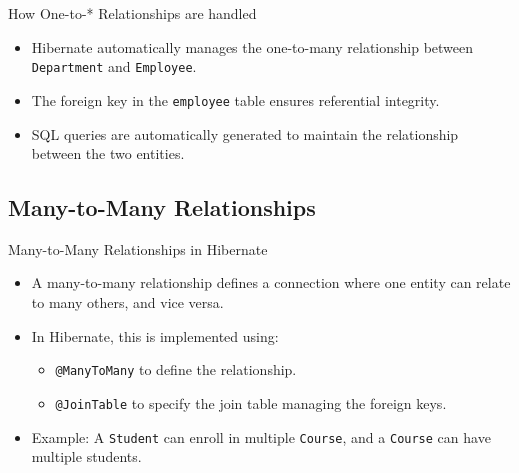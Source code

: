 \documentclass[aspectratio=169, table]{beamer}
\begin{document}
\begin{frame}{How One-to-* Relationships are handled}
	\vspace{20pt}
	\begin{itemize}
		\item Hibernate automatically manages the one-to-many relationship between \texttt{Department} and \texttt{Employee}.
		\item The foreign key in the \texttt{employee} table ensures referential integrity.
		\item SQL queries are automatically generated to maintain the relationship between the two entities.
	\end{itemize}
\end{frame}

\subsection{Many-to-Many Relationships}

\begin{frame}{Many-to-Many Relationships in Hibernate}
	\vspace{20pt}
	\begin{itemize}
		\item A many-to-many relationship defines a connection where one entity can relate to many others, and vice versa.
		\item In Hibernate, this is implemented using:
		\begin{itemize}
			\item \texttt{@ManyToMany} to define the relationship.
			\item \texttt{@JoinTable} to specify the join table managing the foreign keys.
		\end{itemize}
		\item Example: A \texttt{Student} can enroll in multiple \texttt{Course}, and a \texttt{Course} can have multiple students.
	\end{itemize}
\end{frame}
\end{document}
